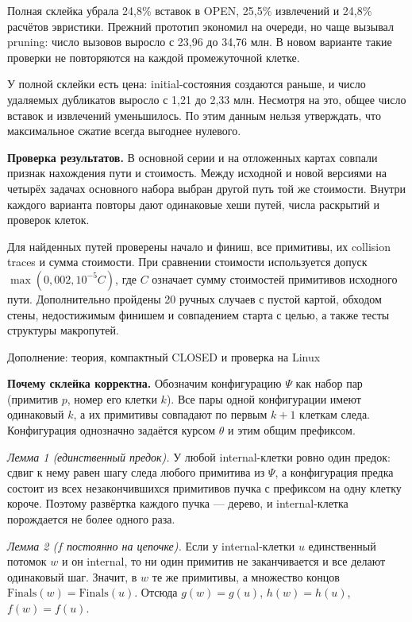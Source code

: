 \documentclass[11pt,a4paper]{article}
\begin{document}
Полная склейка убрала 24,8\% вставок в OPEN, 25,5\% извлечений и 24,8\% расчётов эвристики. Прежний прототип экономил на очереди, но чаще вызывал pruning: число вызовов выросло с 23,96 до 34,76 млн. В новом варианте такие проверки не повторяются на каждой промежуточной клетке.

У полной склейки есть цена: initial-состояния создаются раньше, и число удаляемых дубликатов выросло с 1,21 до 2,33 млн. Несмотря на это, общее число вставок и извлечений уменьшилось. По этим данным нельзя утверждать, что максимальное сжатие всегда выгоднее нулевого.

\textbf{Проверка результатов.} В основной серии и на отложенных картах совпали признак нахождения пути и стоимость. Между исходной и новой версиями на четырёх задачах основного набора выбран другой путь той же стоимости. Внутри каждого варианта повторы дают одинаковые хеши путей, числа раскрытий и проверок клеток.

Для найденных путей проверены начало и финиш, все примитивы, их collision traces и сумма стоимости. При сравнении стоимости используется допуск \(\max(0{,}002,10^{-5}C)\), где \(C\) означает сумму стоимостей примитивов исходного пути. Дополнительно пройдены 20 ручных случаев с пустой картой, обходом стены, недостижимым финишем и совпадением старта с целью, а также тесты структуры макропутей.

\newpage
{\Large Дополнение: теория, компактный CLOSED и проверка на Linux}\par

\textbf{Почему склейка корректна.} Обозначим конфигурацию \(\Psi\) как набор пар (примитив \(p\), номер его клетки \(k\)). Все пары одной конфигурации имеют одинаковый \(k\), а их примитивы совпадают по первым \(k+1\) клеткам следа. Конфигурация однозначно задаётся курсом \(\theta\) и этим общим префиксом.

\emph{Лемма 1 (единственный предок).} У любой internal-клетки ровно один предок: сдвиг к нему равен шагу следа любого примитива из \(\Psi\), а конфигурация предка состоит из всех незакончившихся примитивов пучка с префиксом на одну клетку короче. Поэтому развёртка каждого пучка — дерево, и internal-клетка порождается не более одного раза.

\emph{Лемма 2 (\(f\) постоянно на цепочке).} Если у internal-клетки \(u\) единственный потомок \(w\) и он internal, то ни один примитив не заканчивается и все делают одинаковый шаг. Значит, в \(w\) те же примитивы, а множество концов \(\mathrm{Finals}(w)=\mathrm{Finals}(u)\). Отсюда \(g(w)=g(u)\), \(h(w)=h(u)\), \(f(w)=f(u)\).
\end{document}
